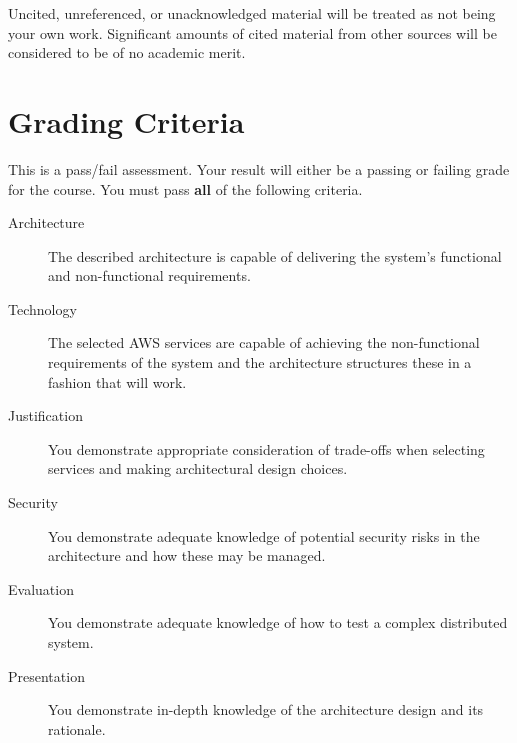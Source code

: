 \documentclass{csse4400}
\begin{document}
Uncited, unreferenced, or unacknowledged material will be treated as not being your own work.
Significant amounts of cited material from other sources will be considered to be of no academic merit.


\section{Grading Criteria}
This is a pass/fail assessment.
Your result will either be a passing or failing grade for the course.
You must pass \textbf{all} of the following criteria.
\begin{description}
    \item[Architecture] The described architecture is capable of delivering the system's functional and non-functional requirements.
    \item[Technology] The selected AWS services are capable of achieving the non-functional requirements of the system and the architecture structures these in a fashion that will work.
    \item[Justification] You demonstrate appropriate consideration of trade-offs when selecting services and making architectural design choices.
    \item[Security] You demonstrate adequate knowledge of potential security risks in the architecture and how these may be managed.
    \item[Evaluation] You demonstrate adequate knowledge of how to test a complex distributed system.
    \item[Presentation] You demonstrate in-depth knowledge of the architecture design and its rationale.
\end{description}
\end{document}
